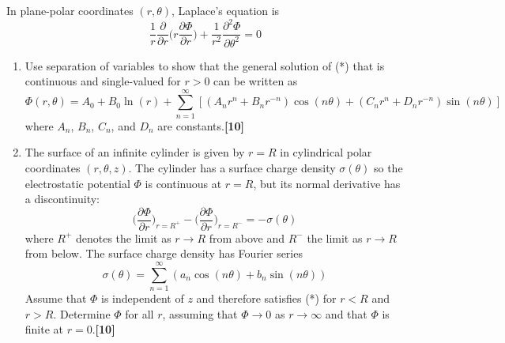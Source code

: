 \documentclass[a4paper]{article}
\begin{document}
\begin{qns}
In plane-polar coordinates $(r, \theta)$, Laplace’s equation is
\begin{equation}
\frac{1}{r}\frac{\partial}{\partial r}\bigg(r\frac{\partial\Phi}{\partial r}\bigg)+\frac{1}{r^2}\frac{\partial^2\Phi}{\partial\theta^2}=0\tag{*}
\end{equation}
\begin{enumerate}[label=(\alph*)]
\item Use separation of variables to show that the general solution of (*) that is continuous and single-valued for $r > 0$ can be written as
$$\Phi(r,\theta)=A_0+B_0\ln(r)+\sum_{n=1}^\infty[(A_nr^n+B_nr^{-n})\cos(n\theta)+(C_nr^n+D_nr^{-n})\sin(n\theta)]$$
where $A_n$, $B_n$, $C_n$, and $D_n$ are constants.\hfill\textbf{[10]}
\item The surface of an infinite cylinder is given by $r = R$ in cylindrical polar coordinates $(r,\theta,z)$. The cylinder has a surface charge density $\sigma(\theta)$ so the electrostatic potential $\Phi$ is continuous at $r = R$, but its normal derivative has a discontinuity:
$$\bigg(\frac{\partial\Phi}{\partial r}\bigg)_{r=R^+}-\bigg(\frac{\partial\Phi}{\partial r}\bigg)_{r=R^-}=-\sigma(\theta)$$
where $R^+$ denotes the limit as $r\rightarrow R$ from above and $R^−$ the limit as $r\rightarrow R$ from below. The surface charge density has Fourier series
$$\sigma(\theta)=\sum_{n=1}^\infty(a_n\cos(n\theta)+b_n\sin(n\theta))$$
Assume that $\Phi$ is independent of $z$ and therefore satisfies (*) for $r < R$ and $r > R$. Determine $\Phi$ for all $r$, assuming that $\Phi\rightarrow0$ as $r\rightarrow\infty$ and that $\Phi$ is finite at $r = 0$.\hfill\textbf{[10]}
\end{enumerate}
\end{qns}
\end{document}
